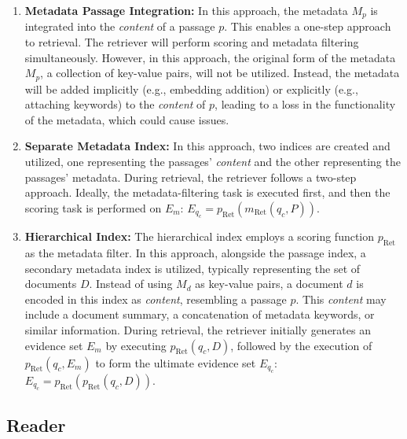 \begin{enumerate}
    \item \textbf{Metadata Passage Integration:} In this approach, the metadata $M_p$ is integrated into the \textit{content} of a passage $p$. This enables a one-step approach to retrieval. The retriever will perform scoring and metadata filtering simultaneously. However, in this approach, the original form of the metadata $M_p$, a collection of key-value pairs, will not be utilized. Instead, the metadata will be added implicitly (e.g., embedding addition) or explicitly (e.g., attaching keywords) to the \textit{content} of $p$, leading to a loss in the functionality of the metadata, which could cause issues.
    \item \textbf{Separate Metadata Index:} In this approach, two indices are created and utilized, one representing the passages' \textit{content} and the other representing the passages' metadata. During retrieval, the retriever follows a two-step approach. Ideally, the metadata-filtering task is executed first, and then the scoring task is performed on $E_m$: $E_{q_c} = p_{\text{Ret}}(m_{\text{Ret}}(q_c,P))$.
    \item \textbf{Hierarchical Index:} The hierarchical index employs a scoring function $p_{\text{Ret}}$ as the metadata filter. In this approach, alongside the passage index, a secondary metadata index is utilized, typically representing the set of documents $D$. Instead of using $M_d$ as key-value pairs, a document $d$ is encoded in this index as \textit{content}, resembling a passage $p$. This \textit{content} may include a document summary, a concatenation of metadata keywords, or similar information. During retrieval, the retriever initially generates an evidence set $E_m$ by executing $p_{\text{Ret}}(q_c, D)$, followed by the execution of $p_{\text{Ret}}(q_c, E_m)$ to form the ultimate evidence set $E_{q_c}$: $E_{q_c} = p_{\text{Ret}}(p_{\text{Ret}}(q_c, D))$.
\end{enumerate}

\subsection{Reader}
\label{subsec:reader}




